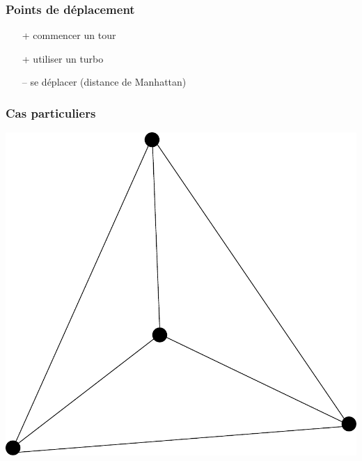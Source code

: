 \documentclass{beamer}
\begin{document}
\begin{frame}
	\frametitle{Points de déplacement}
	\begin{itemize}
	\item[+] commencer un tour
	\item[+] utiliser un turbo
    \item[\alert{--}] se déplacer (distance de Manhattan)
	\end{itemize}
\end{frame}

\begin{frame}
	\frametitle{Cas particuliers}
    \begin{center}
    \includegraphics[height=0.7\textheight]{../triangle3.pdf}
    \end{center}
\end{frame}
\end{document}
